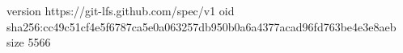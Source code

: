 version https://git-lfs.github.com/spec/v1
oid sha256:cc49c51cf4e5f6787ca5e0a063257db950b0a6a4377acad96fd763be4e3e8aeb
size 5566
